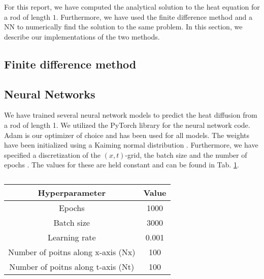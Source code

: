 For this report, we have computed the analytical solution to the heat equation for a rod of length $1$. 
Furthermore, we have used the finite difference method and a NN to numerically find the solution to the same problem. 
In this section, we describe our implementations of the two methods. 

\subsection{Finite difference method}



\subsection{Neural Networks}


We have trained several neural network models to predict the heat diffusion from a rod of length 1. 
We utilized the PyTorch library \cite{Ansel_PyTorch_2_Faster_2024}  for the neural network code. 
Adam is our optimizer of choice and has been used for all models. 
The weights have been initialized using a Kaiming normal distribution . 
Furthermore, we have specified a discretization of the $(x,t)$-grid, the batch size and the number of epochs . 
The values for these are held constant and can be found in Tab. \ref{tab:valuesfornn}. 

\begin{table}[h!]
    \centering
    \begin{tabular}{|c|c|}
    \hline
        \textbf{Hyperparameter} & \textbf{Value}  \\ \hline
        Epochs & 1000  \\ \hline
        Batch size & 3000 \\\hline
        Learning rate & 0.001 \\ \hline
        Number of poitns along x-axis (Nx) & 100 \\ \hline
        Number of poitns along t-axis (Nt) & 100 \\ \hline
    \end{tabular}
    \caption{}
    \label{tab:valuesfornn}
\end{table}

